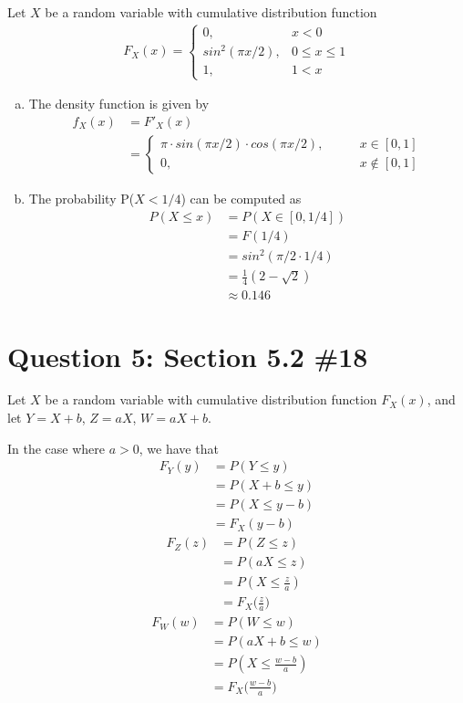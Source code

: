\documentclass[11pt, oneside]{article}   	%
\begin{document}
Let $X$ be a random variable with cumulative distribution function
\begin{align*}
		F_X(x) = \begin{cases}
					0, \qquad & x<0 \\
					sin^2(\pi x/2), & 0 \leq x \leq 1 \\
					1, & 1 < x
				\end{cases}
\end{align*}
\begin{enumerate}[(a)]
	\item The density function is given by
	\begin{align*}
		f_X(x) & = F'_X(x) \\
		& = \begin{cases}
					\pi \cdot sin(\pi x/2) \cdot cos(\pi x/2), \qquad & x \in [0,1] \\
					0, & x \notin [0,1]
				\end{cases}
	\end{align*}
	\item The probability P($X < 1/4$) can be computed as
	\begin{align*}
		P(X \leq x) & = P(X \in [0, 1/4]) \\
		& = F(1/4)\\
		& = sin^2(\pi/2 \cdot 1/4) \\
		& = \frac{1}{4}(2-\sqrt{2}) \\
		& \approx 0.146
	\end{align*}
\end{enumerate}


\section*{Question 5: Section 5.2 \#18}

Let $X$ be a random variable with cumulative distribution function $F_X(x)$, and let $Y=X+b$, $Z=aX$, $W=aX+b$.

In the case where $a >0$, we have that
\begin{align*}
	F_Y(y) & = P(Y \leq y) \\
	& = P(X+b \leq y) \\
	& = P(X \leq y-b) \\
	& = F_X(y-b)
\end{align*}
\begin{align*}
	F_Z(z) & = P(Z \leq z) \\
	& = P(aX \leq z) \\
	& = P(X \leq \frac{z}{a}) \\
	& = F_X\Big(\frac{z}{a}\Big)
\end{align*}
\begin{align*}
	F_W(w) & = P(W \leq w) \\
	& = P(aX+b \leq w) \\
	& = P(X \leq \frac{w-b}{a}) \\
	& = F_X\Big(\frac{w-b}{a}\Big)
\end{align*}
\end{document}

